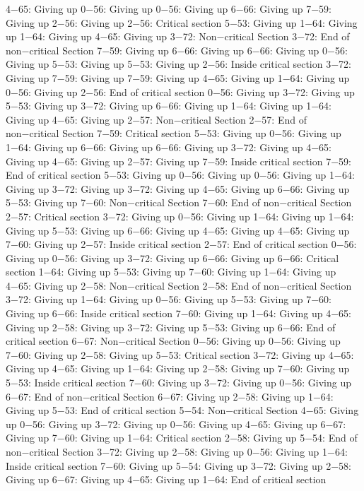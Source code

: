 4−65: Giving up
0−56: Giving up
0−56: Giving up
6−66: Giving up
7−59: Giving up
2−56: Giving up
2−56: Critical section
5−53: Giving up
1−64: Giving up
1−64: Giving up
4−65: Giving up
3−72: Non−critical Section
3−72: End of non−critical Section
7−59: Giving up
6−66: Giving up
6−66: Giving up
0−56: Giving up
5−53: Giving up
5−53: Giving up
2−56: Inside critical section
3−72: Giving up
7−59: Giving up
7−59: Giving up
4−65: Giving up
1−64: Giving up
0−56: Giving up
2−56: End of critical section
0−56: Giving up
3−72: Giving up
5−53: Giving up
3−72: Giving up
6−66: Giving up
1−64: Giving up
1−64: Giving up
4−65: Giving up
2−57: Non−critical Section
2−57: End of non−critical Section
7−59: Critical section
5−53: Giving up
0−56: Giving up
1−64: Giving up
6−66: Giving up
6−66: Giving up
3−72: Giving up
4−65: Giving up
4−65: Giving up
2−57: Giving up
7−59: Inside critical section
7−59: End of critical section
5−53: Giving up
0−56: Giving up
0−56: Giving up
1−64: Giving up
3−72: Giving up
3−72: Giving up
4−65: Giving up
6−66: Giving up
5−53: Giving up
7−60: Non−critical Section
7−60: End of non−critical Section
2−57: Critical section
3−72: Giving up
0−56: Giving up
1−64: Giving up
1−64: Giving up
5−53: Giving up
6−66: Giving up
4−65: Giving up
4−65: Giving up
7−60: Giving up
2−57: Inside critical section
2−57: End of critical section
0−56: Giving up
0−56: Giving up
3−72: Giving up
6−66: Giving up
6−66: Critical section
1−64: Giving up
5−53: Giving up
7−60: Giving up
1−64: Giving up
4−65: Giving up
2−58: Non−critical Section
2−58: End of non−critical Section
3−72: Giving up
1−64: Giving up
0−56: Giving up
5−53: Giving up
7−60: Giving up
6−66: Inside critical section
7−60: Giving up
1−64: Giving up
4−65: Giving up
2−58: Giving up
3−72: Giving up
5−53: Giving up
6−66: End of critical section
6−67: Non−critical Section
0−56: Giving up
0−56: Giving up
7−60: Giving up
2−58: Giving up
5−53: Critical section
3−72: Giving up
4−65: Giving up
4−65: Giving up
1−64: Giving up
2−58: Giving up
7−60: Giving up
5−53: Inside critical section
7−60: Giving up
3−72: Giving up
0−56: Giving up
6−67: End of non−critical Section
6−67: Giving up
2−58: Giving up
1−64: Giving up
5−53: End of critical section
5−54: Non−critical Section
4−65: Giving up
0−56: Giving up
3−72: Giving up
0−56: Giving up
4−65: Giving up
6−67: Giving up
7−60: Giving up
1−64: Critical section
2−58: Giving up
5−54: End of non−critical Section
3−72: Giving up
2−58: Giving up
0−56: Giving up
1−64: Inside critical section
7−60: Giving up
5−54: Giving up
3−72: Giving up
2−58: Giving up
6−67: Giving up
4−65: Giving up
1−64: End of critical section
